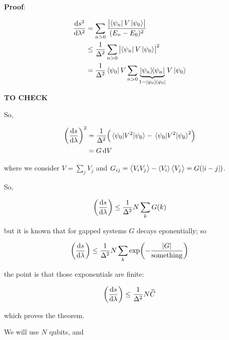 \documentclass[main.tex]{subfiles}
\begin{document}
\begin{greenbox}
  \textbf{Proof}:

  \begin{subequations}
  \begin{align}
    \dv{s^2}{\lambda^2}  &= \sum _{n>0}  \frac{\abs{\bra{\psi_n} V \ket{\psi_0}}}{(E_n - E_0)^2}  \\
    &\leq \frac{1}{\Delta^2} \sum _{n>0} \abs{\bra{\psi_n} V \ket{\psi_0}}^2  \\
    &=  \frac{1}{\Delta^2} \bra{\psi_0} V   \sum _{n>0} \underbrace{\dyad{\psi_n}}_{\substack{1 - \ketbra{\psi_0}{\psi_0}}} V \ket{\psi_0}
  \end{align}
  \end{subequations}

  \textbf{TO CHECK}

  So,

  \begin{subequations}
  \begin{align}
    \qty(\dv{s}{\lambda})^2  &=  \frac{1}{\Delta^2} \qty(\ev{V^2}{\psi_0} - \ev{V^2}{\psi_0}^2)  \\
    &= G \dd{V}
  \end{align}
  \end{subequations}

  where we consider \(V = \sum _{j}  V_j \) and \(G _{ij} = \expval{V_i V_j} - \expval{V_i} \expval{V_j} = G(\abs{i-j} ) \).

  So,

  \begin{equation}
    \qty(\dv{s}{\lambda} ) \leq \frac{1}{\Delta^2} N \sum _{k} G(k)
  \end{equation}

  but it is known that for gapped systems \(G\) decays eponentially; so

  \begin{equation}
    \qty(\dv{s}{\lambda} ) \leq \frac{1}{\Delta^2} N \sum _{k} \exp(-\frac{\abs{G}}{\text{something}}  )
  \end{equation}

  the point is that those exponentials are finite:

  \begin{equation}
    \qty(\dv{s}{\lambda} ) \leq \frac{1}{\Delta^2} N \widetilde{C}
  \end{equation}

  which proves the theorem.
\end{greenbox}

We will use \(N\) qubits, and
\end{document}
